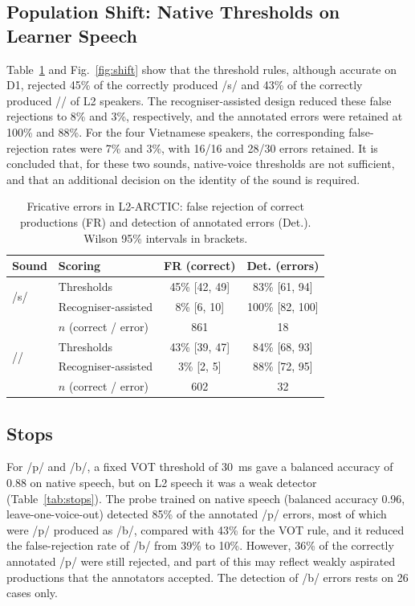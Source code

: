 \documentclass[conference]{IEEEtran}
\newcommand{\ipa}[1]{/#1/}
\begin{document}
\subsection{Population Shift: Native Thresholds on Learner Speech}
Table~\ref{tab:l2} and Fig.~\ref{fig:shift} show that the threshold rules, although accurate on D1, rejected 45\% of the correctly produced \ipa{s} and 43\% of the correctly produced \ipa{\textesh} of L2 speakers. The recogniser-assisted design reduced these false rejections to 8\% and 3\%, respectively, and the annotated errors were retained at 100\% and 88\%. For the four Vietnamese speakers, the corresponding false-rejection rates were 7\% and 3\%, with 16/16 and 28/30 errors retained. It is concluded that, for these two sounds, native-voice thresholds are not sufficient, and that an additional decision on the identity of the sound is required.

\begin{table}[!htb]
\caption{Fricative errors in L2-ARCTIC: false rejection of correct productions (FR) and detection of annotated errors (Det.). Wilson 95\% intervals in brackets.}
\label{tab:l2}
\centering
\small
\begin{tabular}{llcc}
\toprule
Sound & Scoring & FR (correct) & Det. (errors) \\
\midrule
\multirow{2}{*}{\ipa{s}} & Thresholds & 45\% [42, 49] & 83\% [61, 94] \\
 & Recogniser-assisted & 8\% [6, 10] & 100\% [82, 100] \\
 & \scriptsize{$n$ (correct / error)} & \scriptsize{861} & \scriptsize{18} \\
\midrule
\multirow{2}{*}{\ipa{\textesh}} & Thresholds & 43\% [39, 47] & 84\% [68, 93] \\
 & Recogniser-assisted & 3\% [2, 5] & 88\% [72, 95] \\
 & \scriptsize{$n$ (correct / error)} & \scriptsize{602} & \scriptsize{32} \\
\bottomrule
\end{tabular}
\end{table}

\subsection{Stops}
For \ipa{p} and \ipa{b}, a fixed VOT threshold of 30~ms gave a balanced accuracy of 0.88 on native speech, but on L2 speech it was a weak detector (Table~\ref{tab:stops}). The probe trained on native speech (balanced accuracy 0.96, leave-one-voice-out) detected 85\% of the annotated \ipa{p} errors, most of which were \ipa{p} produced as \ipa{b}, compared with 43\% for the VOT rule, and it reduced the false-rejection rate of \ipa{b} from 39\% to 10\%. However, 36\% of the correctly annotated \ipa{p} were still rejected, and part of this may reflect weakly aspirated productions that the annotators accepted. The detection of \ipa{b} errors rests on 26 cases only.
\end{document}
